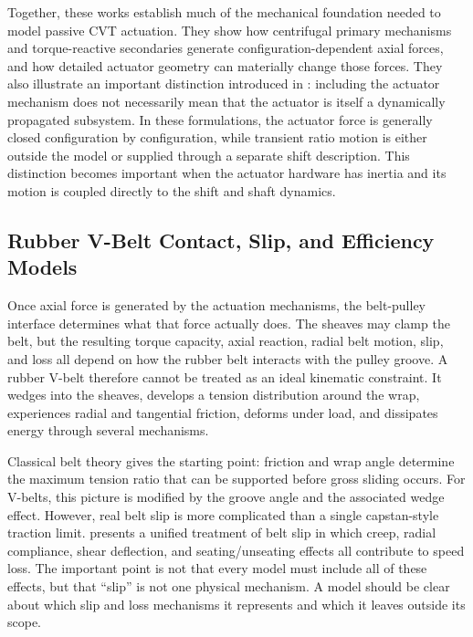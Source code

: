 \documentclass[11pt]{report}
\numberwithin{equation}{section}
\newcounter{theory}
\begin{document}
Together, these works establish much of the mechanical foundation needed to model passive CVT actuation. They show how centrifugal primary mechanisms and torque-reactive secondaries generate configuration-dependent axial forces, and how detailed actuator geometry can materially change those forces. They also illustrate an important distinction introduced in : including the actuator mechanism does not necessarily mean that the actuator is itself a dynamically propagated subsystem. In these formulations, the actuator force is generally closed configuration by configuration, while transient ratio motion is either outside the model or supplied through a separate shift description. This distinction becomes important when the actuator hardware has inertia and its motion is coupled directly to the shift and shaft dynamics.

\subsection{Rubber V-Belt Contact, Slip, and Efficiency Models}
\label{sec:lit-contact-efficiency}

Once axial force is generated by the actuation mechanisms, the belt-pulley interface determines what that force actually does. The sheaves may clamp the belt, but the resulting torque capacity, axial reaction, radial belt motion, slip, and loss all depend on how the rubber belt interacts with the pulley groove. A rubber V-belt therefore cannot be treated as an ideal kinematic constraint. It wedges into the sheaves, develops a tension distribution around the wrap, experiences radial and tangential friction, deforms under load, and dissipates energy through several mechanisms.

Classical belt theory gives the starting point: friction and wrap angle determine the maximum tension ratio that can be supported before gross sliding occurs. For V-belts, this picture is modified by the groove angle and the associated wedge effect. However, real belt slip is more complicated than a single capstan-style traction limit. \citet{Gerbert1996} presents a unified treatment of belt slip in which creep, radial compliance, shear deflection, and seating/unseating effects all contribute to speed loss. The important point is not that every model must include all of these effects, but that ``slip'' is not one physical mechanism. A model should be clear about which slip and loss mechanisms it represents and which it leaves outside its scope.
\end{document}

